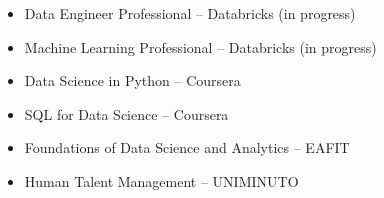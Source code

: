 \begin{itemize}[leftmargin=*]
  \item Data Engineer Professional – Databricks (in progress)
  \item Machine Learning Professional – Databricks (in progress)
  \item Data Science in Python – Coursera
  \item SQL for Data Science – Coursera
  \item Foundations of Data Science and Analytics – EAFIT
  \item Human Talent Management – UNIMINUTO
\end{itemize}
